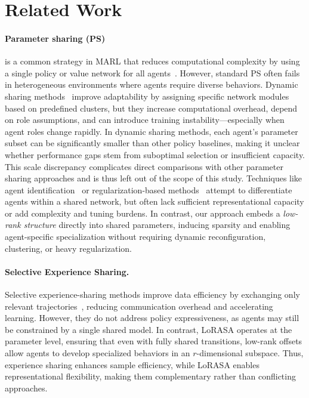 \section{Related Work}
\label{sec:related_work}

\paragraph{Parameter sharing (PS)} is a common strategy in MARL that reduces computational complexity by using a single policy or value network for all agents~\citep{terry2020revisiting}. However, standard PS often fails in heterogeneous environments where agents require diverse behaviors. Dynamic sharing methods~\citep{AdaPS, DynParamSharing} improve adaptability by assigning specific network modules based on predefined clusters, but they increase computational overhead, depend on role assumptions, and can introduce training instability—especially when agent roles change rapidly. In dynamic sharing methods, each agent's parameter subset can be significantly smaller than other policy baselines, making it unclear whether performance gaps stem from suboptimal selection or insufficient capacity. This scale discrepancy complicates direct comparisons with other parameter sharing approaches and is thus left out of the scope of this study. Techniques like agent identification~\citep{terry2020revisiting} or regularization-based methods~\citep{li2021CDS} attempt to differentiate agents within a shared network, but often lack sufficient representational capacity or add complexity and tuning burdens. In contrast, our approach embeds a \emph{low-rank structure} directly into shared parameters, inducing sparsity and enabling agent-specific specialization without requiring dynamic reconfiguration, clustering, or heavy regularization.


\paragraph{Selective Experience Sharing.}
Selective experience-sharing methods improve data efficiency by exchanging only relevant trajectories~\citep{SelectiveSharingExp, SharedExpAC}, reducing communication overhead and accelerating learning. However, they do not address policy expressiveness, as agents may still be constrained by a single shared model. In contrast, LoRASA operates at the parameter level, ensuring that even with fully shared transitions, low-rank offsets allow agents to develop specialized behaviors in an \(r\)-dimensional subspace. Thus, experience sharing enhances sample efficiency, while LoRASA enables representational flexibility, making them complementary rather than conflicting approaches.

